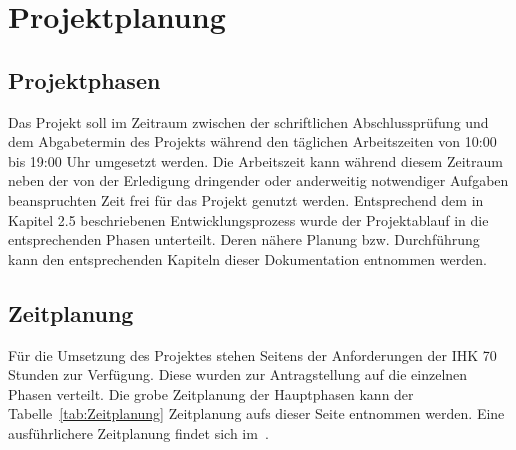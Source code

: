 \section{Projektplanung} 
\label{sec:Projektplanung}

\subsection{Projektphasen}
\label{sec:Projektphasen}
Das Projekt soll im Zeitraum zwischen der schriftlichen Abschlussprüfung und dem Abgabetermin des Projekts während den täglichen Arbeitszeiten von 10:00 bis 19:00 Uhr umgesetzt werden. Die Arbeitszeit kann während diesem Zeitraum neben der von der Erledigung dringender oder anderweitig notwendiger Aufgaben beanspruchten Zeit frei für das Projekt genutzt werden. Entsprechend dem in Kapitel 2.5 beschriebenen Entwicklungsprozess wurde der Projektablauf in die entsprechenden Phasen unterteilt. Deren nähere Planung bzw. Durchführung kann den entsprechenden Kapiteln dieser Dokumentation entnommen werden.

\subsection{Zeitplanung}
\label{sec:Zeitplanung}
Für die Umsetzung des Projektes stehen Seitens der Anforderungen der \ac{IHK} 70 Stunden zur Verfügung. Diese wurden zur Antragstellung auf die einzelnen Phasen verteilt. Die grobe Zeitplanung der Hauptphasen kann der Tabelle~\ref{tab:Zeitplanung} Zeitplanung aufs dieser Seite entnommen werden. Eine ausführlichere Zeitplanung findet sich im~.



